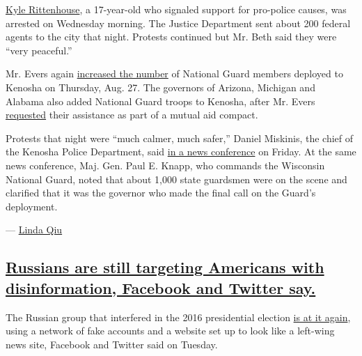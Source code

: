 \href{https://slack-redir.net/link?url=https\%3A\%2F\%2Fwww.nytimes3xbfgragh.onion\%2F2020\%2F08\%2F27\%2Fus\%2Fkyle-rittenhouse-kenosha-shooting-video.html}{Kyle
Rittenhouse}, a 17-year-old who signaled support for pro-police causes,
was arrested on Wednesday morning. The Justice Department sent about 200
federal agents to the city that night. Protests continued but Mr. Beth
said they were ``very peaceful.''

Mr. Evers again
\href{https://slack-redir.net/link?url=https\%3A\%2F\%2Fdma.wi.gov\%2FDMA\%2Fnews\%2F2020news\%2F20188}{increased
the number} of National Guard members deployed to Kenosha on Thursday,
Aug. 27. The governors of Arizona, Michigan and Alabama also added
National Guard troops to Kenosha, after Mr. Evers
\href{https://content.govdelivery.com/accounts/WIGOV/bulletins/29c1bf3}{requested}
their assistance as part of a mutual aid compact.

Protests that night were ``much calmer, much safer,'' Daniel Miskinis,
the chief of the Kenosha Police Department, said
\href{https://slack-redir.net/link?url=https\%3A\%2F\%2Fwww.rev.com\%2Fblog\%2Ftranscripts\%2Fkenosha-officials-press-conference-transcript-august-28}{in
a news conference} on Friday. At the same news conference, Maj. Gen.
Paul E. Knapp, who commands the Wisconsin National Guard, noted that
about 1,000 state guardsmen were on the scene and clarified that it was
the governor who made the final call on the Guard's deployment.

--- \href{https://www.nytimes3xbfgragh.onion/by/linda-qiu}{Linda Qiu}

\hypertarget{russians-are-still-targeting-americans-with-disinformation-facebook-and-twitter-say}{%
\subsection{\texorpdfstring{\protect\hyperlink{russians-are-still-targeting-americans-with-disinformation-facebook-and-twitter-say}{Russians
are still targeting Americans with disinformation, Facebook and Twitter
say.}}{Russians are still targeting Americans with disinformation, Facebook and Twitter say.}}\label{russians-are-still-targeting-americans-with-disinformation-facebook-and-twitter-say}}

The Russian group that interfered in the 2016 presidential election
\href{http://www.nytimes3xbfgragh.onion/2020/09/01/technology/facebook-russia-disinformation-election.html}{is
at it again}, using a network of fake accounts and a website set up to
look like a left-wing news site, Facebook and Twitter said on Tuesday.

